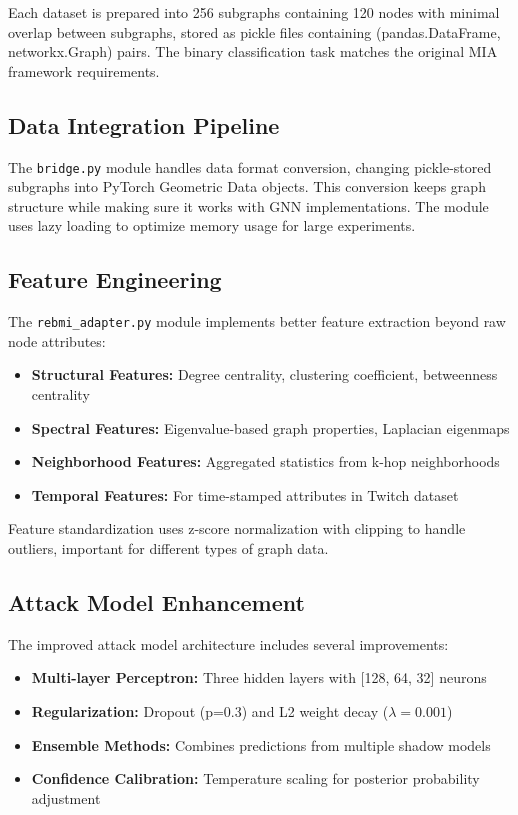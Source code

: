 \documentclass{article}
\begin{document}
Each dataset is prepared into 256 subgraphs containing 120 nodes with minimal overlap between subgraphs, stored as pickle files containing (pandas.DataFrame, networkx.Graph) pairs. The binary classification task matches the original MIA framework requirements.

\subsection{Data Integration Pipeline}
The \texttt{bridge.py} module handles data format conversion, changing pickle-stored subgraphs into PyTorch Geometric Data objects. This conversion keeps graph structure while making sure it works with GNN implementations. The module uses lazy loading to optimize memory usage for large experiments.

\subsection{Feature Engineering}
The \texttt{rebmi\_adapter.py} module implements better feature extraction beyond raw node attributes:

\begin{itemize}
\item \textbf{Structural Features:} Degree centrality, clustering coefficient, betweenness centrality
\item \textbf{Spectral Features:} Eigenvalue-based graph properties, Laplacian eigenmaps
\item \textbf{Neighborhood Features:} Aggregated statistics from k-hop neighborhoods
\item \textbf{Temporal Features:} For time-stamped attributes in Twitch dataset
\end{itemize}

Feature standardization uses z-score normalization with clipping to handle outliers, important for different types of graph data.

\subsection{Attack Model Enhancement}
The improved attack model architecture includes several improvements:

\begin{itemize}
\item \textbf{Multi-layer Perceptron:} Three hidden layers with [128, 64, 32] neurons
\item \textbf{Regularization:} Dropout (p=0.3) and L2 weight decay ($\lambda=0.001$)
\item \textbf{Ensemble Methods:} Combines predictions from multiple shadow models
\item \textbf{Confidence Calibration:} Temperature scaling for posterior probability adjustment
\end{itemize}
\end{document}
